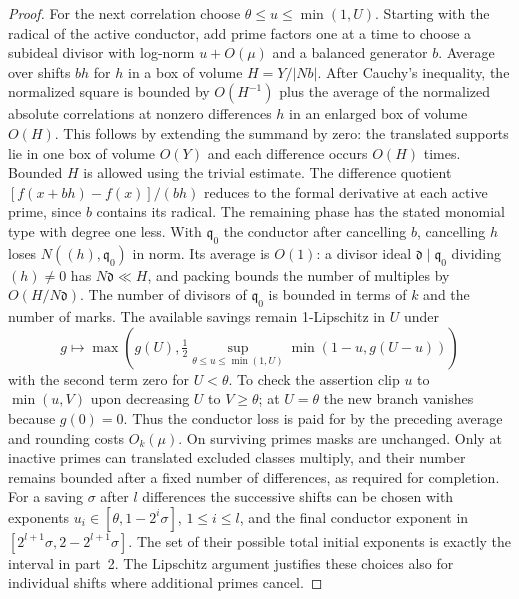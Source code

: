 \documentclass[11pt,letterpaper]{article}
\theoremstyle{definition}
\numberwithin{equation}{section}
\begin{document}
\begin{proof}
For the next correlation choose $\theta\le u\le\min(1,U)$.
Starting with the radical of the active conductor, add prime factors
one at a time to choose a subideal divisor with log-norm
$u+O(\mu)$ and a balanced generator $b$. Average over shifts $bh$
for $h$ in a box of volume $H=Y/|Nb|$. After Cauchy's inequality,
the normalized square is bounded by $O(H^{-1})$ plus the average
of the normalized absolute correlations at nonzero differences
$h$ in an enlarged box of volume $O(H)$. This follows by extending
the summand by zero: the translated supports lie in one box of
volume $O(Y)$ and each difference occurs $O(H)$ times. Bounded
$H$ is allowed using the trivial estimate. The difference quotient
$[f(x+bh)-f(x)]/(bh)$ reduces to the formal derivative at each
active prime, since $b$ contains its radical. The remaining phase
has the stated monomial type with degree one less. With
$\mathfrak q_0$ the conductor after cancelling $b$, cancelling $h$
loses $N((h),\mathfrak q_0)$ in norm. Its average is $O(1)$:
a divisor ideal $\mathfrak d\mid\mathfrak q_0$ dividing
$(h)\ne0$ has $N\mathfrak d\ll H$, and packing bounds the
number of multiples by $O(H/N\mathfrak d)$. The number of divisors
of $\mathfrak q_0$ is bounded in terms of $k$ and the number of
marks. The available savings remain 1-Lipschitz in $U$ under
\[
 g\longmapsto\max\left(g(U),
 \tfrac12\sup_{\theta\le u\le\min(1,U)}
               \min(1-u,g(U-u))\right)
\]
with the second term zero for $U<\theta$. To check the assertion
clip $u$ to $\min(u,V)$ upon decreasing $U$ to $V\ge\theta$;
at $U=\theta$ the new branch vanishes because $g(0)=0$.
Thus the conductor loss is paid for by the preceding average and
rounding costs $O_k(\mu)$. On surviving primes masks are unchanged.
Only at inactive primes can translated excluded classes multiply,
and their number remains bounded after a fixed number of differences,
as required for completion. For a saving $\sigma$ after $l$
differences the successive shifts can be chosen with exponents
$u_i\in[\theta,1-2^i\sigma]$, $1\le i\le l$, and the final
conductor exponent in $[2^{l+1}\sigma,2-2^{l+1}\sigma]$.
The set of their possible total initial exponents is exactly the
interval in part~2. The Lipschitz argument justifies these choices
also for individual shifts where additional primes cancel.
\end{proof}
\end{document}
